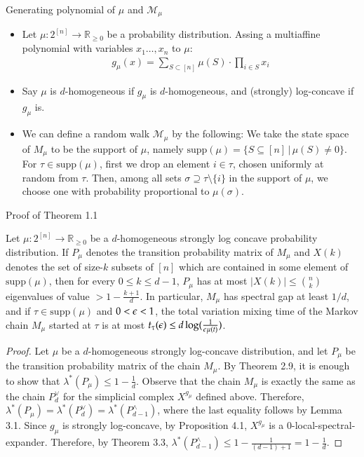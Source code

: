 \documentclass[10pt]{beamer}
\newcommand{\R}{\mathbb{R}}
\newcommand{\supp}{\mathrm{supp}}
\begin{document}
\begin{frame}{Generating polynomial of $\mu$ and $\mathcal{M}_\mu$}
\begin{itemize}
    \item Let $\mu: 2^{[n]} \to \R_{\geq 0}$ be a probability distribution. Assing a multiaffine polynomial with variables $x_1 \ldots, x_n$ to $\mu$:
    \begin{align*}
        g_\mu(x) = \sum_{S\subset [n]} \mu(S) \cdot \prod_{i \in S} x_i
    \end{align*}
    \item Say $\mu$ is $d$-homogeneous if $g_\mu$ is $d$-homogeneous, and (strongly) log-concave if $g_\mu$ is. 
    \item We can define a random walk $\mathcal{M}_\mu$ by the following: We take the state space of $M_\mu$ to be the support of $\mu$, namely $\text{supp}(\mu) = \{S \subseteq [n] \,|\, \mu(S) \neq 0\}$. For $\tau \in \text{supp}(\mu)$, first we drop an element $i \in \tau$, chosen uniformly at random from $\tau$. Then, among all sets $\sigma \supseteq \tau \setminus \{i\}$ in the support of $\mu$, we choose one with probability proportional to $\mu(\sigma)$.
 
\end{itemize}
\end{frame}

\begin{frame}{Proof of Theorem 1.1}
    \footnotesize\begin{theorem}[1.1]
        Let $\mu: 2^{[n]} \to \R_{\geq 0}$ be a $d$-homogeneous strongly log concave probability distribution. If $P_\mu$ denotes the transition probability matrix of $M_\mu$ and $X(k)$ denotes the set of size-$k$ subsets of $[n]$ which are contained in some element of $\supp(\mu)$, then for every $0 \leq k \leq d-1$, $P_\mu$ has at most $|X(k)| \leq {n \choose k}$ eigenvalues of value $> 1 - \frac{k+1}d$. In particular, $M_\mu$ has spectral gap at least $1/d$, and if $\tau \in \supp(\mu)$ and $0 < \epsilon < 1$, the total variation mixing time of the Markov chain $M_\mu$ started at $\tau$ is at most $t_\tau(\epsilon) \leq d\log(\frac{1}{\epsilon\mu(t)})$.
    \end{theorem}
    \begin{proof}
         Let \( \mu \) be a \( d \)-homogeneous strongly log-concave distribution, and let \( P_{\mu} \) be the transition probability matrix of the chain \( M_{\mu} \). By Theorem 2.9, it is enough to show that \( \lambda^*(P_{\mu}) \leq 1 - \frac{1}{d} \). Observe that the chain \( M_{\mu} \) is exactly the same as the chain \( P^{\vee}_d \) for the simplicial complex \( X^{g_{\mu}} \) defined above. Therefore, \( \lambda^*(P_{\mu}) = \lambda^*(P^{\vee}_d) = \lambda^*(P^{\wedge}_{d-1}) \), where the last equality follows by Lemma 3.1. Since \( g_{\mu} \) is strongly log-concave, by Proposition 4.1, \( X^{g_{\mu}} \) is a \( 0 \)-local-spectral-expander. Therefore, by Theorem 3.3, \( \lambda^*(P^{\wedge}_{d-1}) \leq 1 - \frac{1}{(d-1) + 1} = 1 - \frac{1}{d} \).
    \end{proof}       
\end{frame}
\end{document}
